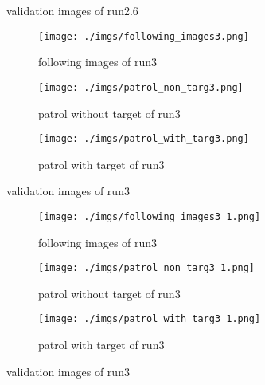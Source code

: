 \documentclass[paper=a4, fontsize=11pt]{scrartcl} %
\numberwithin{equation}{section} %
\numberwithin{figure}{section} %
\numberwithin{table}{section} %
\begin{document}
\begin{enumerate}
\begin{itemize}
{\begin{figure}[ht]
	\caption{validation images of run2.6}
	\label{fig:outputimages26}
\end{figure}

\begin{figure}[ht]
	\begin{subfigure}{0.33\textwidth}
	\texttt{[image: ./imgs/following\_images3.png]} 
	\caption{following images of run3}
	\label{fig:subfollowing_images3}
	\end{subfigure}
	\begin{subfigure}{0.33\textwidth}
	\texttt{[image: ./imgs/patrol\_non\_targ3.png]}
	\caption{patrol without target of run3}
	\label{fig:subpatrol_non_targ3}
	\end{subfigure}
	\begin{subfigure}{0.33\textwidth}
	\texttt{[image: ./imgs/patrol\_with\_targ3.png]}
	\caption{patrol with target of run3}
	\label{fig:subpatrol_with_targ3}
	\end{subfigure}

	\caption{validation images of run3}
	\label{fig:outputimages3}
\end{figure}

\begin{figure}[ht]
	\begin{subfigure}{0.33\textwidth}
	\texttt{[image: ./imgs/following\_images3\_1.png]} 
	\caption{following images of run3}
	\label{fig:subfollowing_images31}
	\end{subfigure}
	\begin{subfigure}{0.33\textwidth}
	\texttt{[image: ./imgs/patrol\_non\_targ3\_1.png]}
	\caption{patrol without target of run3}
	\label{fig:subpatrol_non_targ31}
	\end{subfigure}
	\begin{subfigure}{0.33\textwidth}
	\texttt{[image: ./imgs/patrol\_with\_targ3\_1.png]}
	\caption{patrol with target of run3}
	\label{fig:subpatrol_with_targ31}
	\end{subfigure}

	\caption{validation images of run3}
	\label{fig:outputimages31}
\end{figure}

}
\end{itemize}
\end{enumerate}
\end{document}

